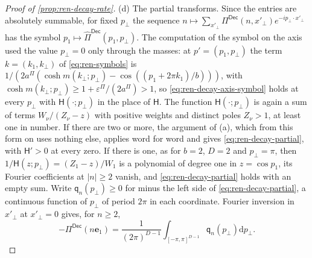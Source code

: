 \begin{proof}[Proof of \cref{prop:ren-decay-rate}]
(d) The partial transforms. Since the entries are absolutely summable, for fixed $p_\perp$ the sequence $n\mapsto\sum_{x'_\perp}\Pi^{\mathsf{Dec}}(n,x'_\perp)e^{-ip_\perp\cdot x'_\perp}$ has the symbol $p_1\mapsto\hat\Pi^{\mathsf{Dec}}(p_1,p_\perp)$. The computation of the symbol on the axis used the value $p_\perp=0$ only through the masses: at $p'=(p_1,p_\perp)$ the term $k=(k_1,k_\perp)$ of \eqref{eq:ren-symbols} is $1/(2a^\Pi(\cosh m(k_\perp;p_\perp)-\cos((p_1+2\pi k_1)/b)))$, with $\cosh m(k_\perp;p_\perp)\ge1+\varepsilon^\Pi/(2a^\Pi)>1$, so \eqref{eq:ren-decay-axis-symbol} holds at every $p_\perp$ with $\mathsf H(\cdot;p_\perp)$ in the place of $\mathsf H$. The function $\mathsf H(\cdot;p_\perp)$ is again a sum of terms $W_\nu/(Z_\nu-z)$ with positive weights and distinct poles $Z_\nu>1$, at least one in number. If there are two or more, the argument of (a), which from this form on uses nothing else, applies word for word and gives \eqref{eq:ren-decay-partial}, with $\mathsf H'>0$ at every zero. If there is one, as for $b=2$, $D=2$ and $p_\perp=\pi$, then $1/\mathsf H(z;p_\perp)=(Z_1-z)/W_1$ is a polynomial of degree one in $z=\cos p_1$, its Fourier coefficients at $\lvert n\rvert\ge2$ vanish, and \eqref{eq:ren-decay-partial} holds with an empty sum. Write $\mathsf q_n(p_\perp)\ge0$ for minus the left side of \eqref{eq:ren-decay-partial}, a continuous function of $p_\perp$ of period $2\pi$ in each coordinate. Fourier inversion in $x'_\perp$ at $x'_\perp=0$ gives, for $n\ge2$,
\begin{equation}\label{eq:ren-decay-axis-integral}
-\Pi^{\mathsf{Dec}}(n\mathbf e_1)=\frac1{(2\pi)^{D-1}}\int_{[-\pi,\pi]^{D-1}}\mathsf q_n(p_\perp)\mathrm dp_\perp.
\end{equation}


\end{proof}
